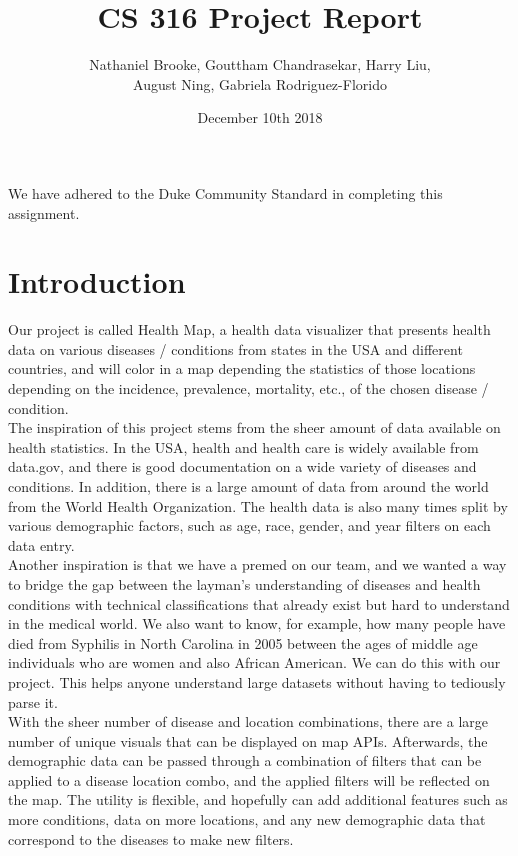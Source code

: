 \documentclass[12pt]{article}
\title{CS 316 Project Report}
\author{Nathaniel Brooke, Gouttham Chandrasekar, Harry Liu,\\August Ning, Gabriela Rodriguez-Florido}
\date{December 10th 2018}
\begin{document}
\maketitle

We have adhered to the Duke Community Standard in completing this assignment.
\pagebreak

\section{Introduction}
Our project is called Health Map, a health data visualizer that presents health data on various diseases / conditions from states in the USA and different countries, and will color in a map depending the statistics of those locations depending on the incidence, prevalence, mortality, etc., of the chosen disease / condition.\\

The inspiration of this project stems from the sheer amount of data available on health statistics. In the USA, health and health care is widely available from data.gov, and there is good documentation on a wide variety of diseases and conditions. In addition, there is a large amount of data from around the world from the World Health Organization. The health data is also many times split by various demographic factors, such as age, race, gender, and year filters on each data entry.\\

Another inspiration is that we have a premed on our team, and we wanted a way to bridge the gap between the layman's understanding of diseases and health conditions with technical classifications that already exist but hard to understand in the medical world. We also want to know, for example, how many people have died from Syphilis in North Carolina in 2005 between the ages of middle age individuals who are women and also African American. We can do this with our project. This helps anyone understand large datasets without having to tediously parse it.\\

With the sheer number of disease and location combinations, there are a large number of unique visuals that can be displayed on map APIs. Afterwards, the demographic data can be passed through a combination of filters that can be applied to a disease location combo, and the applied filters will be reflected on the map. The utility is flexible, and hopefully can add additional features such as more conditions, data on more locations, and any new demographic data that correspond to the diseases to make new filters.\\
\end{document}
